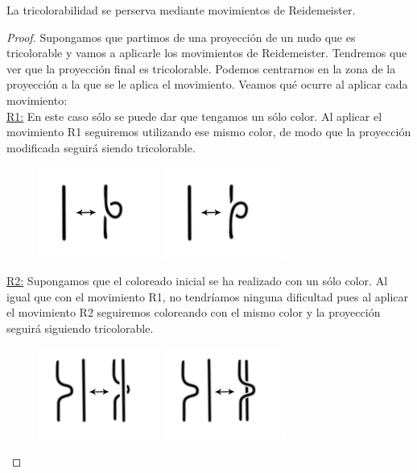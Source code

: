\documentclass[14pt]{extarticle}
\begin{document}
\begin{teo}
	La tricolorabilidad se perserva mediante movimientos de Reidemeister.
\begin{proof}
	Supongamos que partimos de una proyección de un nudo que es tricolorable y vamos a aplicarle los movimientos de Reidemeister. Tendremos que ver que la proyección final es tricolorable. Podemos centrarnos en la zona de la proyección a la que se le aplica el movimiento. Veamos qué ocurre al aplicar cada movimiento:\\
	
	\underline{R1:}
	En este caso sólo se puede dar que tengamos un sólo color. Al aplicar el movimiento R1 seguiremos utilizando ese mismo color, de modo que la proyección modificada seguirá siendo tricolorable. 
	   \begin{figure}[h!]
	   	\centering
	   	\includegraphics[width=4cm]{inudos/movi1.png}
	   	\includegraphics[width=4cm]{inudos/movi2.png}
	   	\caption{}
	   	\label{demotri1} 
	   \end{figure}
	   
	\underline{R2:}
	Supongamos que el coloreado inicial se ha realizado con un sólo color. Al igual que con el movimiento R1, no tendríamos ninguna dificultad pues al aplicar el movimiento R2 seguiremos coloreando con el mismo color y la proyección seguirá siguiendo tricolorable. \\
	\begin{figure}[h!]
		\centering
		\includegraphics[width=4cm]{inudos/movi3.png}
		\includegraphics[width=4cm]{inudos/movi4.png}
		\caption{}
		\label{demotri2} 
	\end{figure}
	

\end{proof}
\end{teo}
\end{document}
